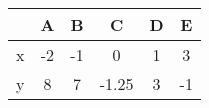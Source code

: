 \begin{center}
    \begin{tabular}{|c|c|c|c|c|c|} 
        \hline
               & A& B & C & D & E \\ 
        \hline
            x   & -2 & -1 & 0 & 1 & 3 \\ 
        \hline
            y   & 8 & 7 & -1.25 & 3 & -1 \\ 
        \hline
    \end{tabular}
\end{center}  